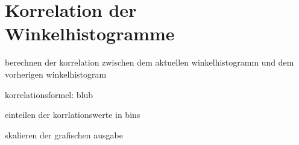 \section{Korrelation der Winkelhistogramme}

berechnen der korrelation zwischen dem aktuellen winkelhistogramm und dem vorherigen winkelhistogram

korrelationsformel: blub

einteilen der korrlationswerte in bins

skalieren der grafischen ausgabe